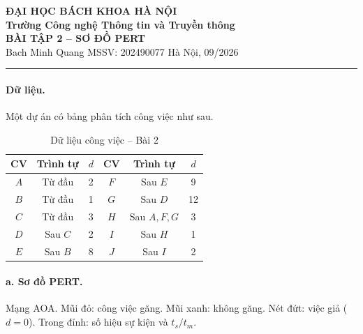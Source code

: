 \documentclass[12pt,a4paper]{article}
\begin{document}
\begin{center}
  {\large\bfseries ĐẠI HỌC BÁCH KHOA HÀ NỘI}\\[0.4pt]
  {\bfseries Trường Công nghệ Thông tin và Truyền thông}\\[3.5pt]
  {\Large\bfseries BÀI TẬP 2 -- SƠ ĐỒ PERT}\\[0.5pt]
  {\small Bach Minh Quang \quad MSSV: 202490077 \quad Hà Nội, 09/2026}
\end{center}
\vspace{-2pt}
\hrule
\vspace{5pt}

\paragraph{Dữ liệu.}
Một dự án có bảng phân tích công việc như sau.

\begin{table}[H]\centering
\caption{Dữ liệu công việc -- Bài 2}
\small
\begin{tabular}{cccccc}
\toprule
\textbf{CV} & \textbf{Trình tự} & \textbf{$d$} &
\textbf{CV} & \textbf{Trình tự} & \textbf{$d$}\\
\midrule
$A$ & Từ đầu & 2 & $F$ & Sau $E$ & 9\\
$B$ & Từ đầu & 1 & $G$ & Sau $D$ & 12\\
$C$ & Từ đầu & 3 & $H$ & Sau $A,F,G$ & 3\\
$D$ & Sau $C$ & 2 & $I$ & Sau $H$ & 1\\
$E$ & Sau $B$ & 8 & $J$ & Sau $I$ & 2\\
\bottomrule
\end{tabular}
\end{table}

\paragraph{a. Sơ đồ PERT.}
Mạng AOA. Mũi đỏ: công việc găng. Mũi xanh: không găng. Nét đứt: việc giả ($d=0$).
Trong đỉnh: số hiệu sự kiện và $t_s/t_m$.
\end{document}
